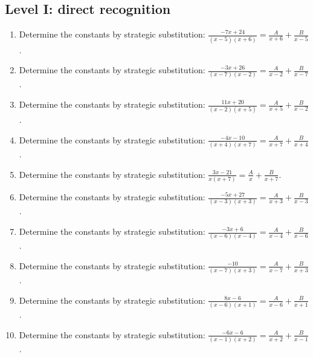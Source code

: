 \documentclass[11pt,oneside]{book}
\begin{document}
\subsection*{Level I: direct recognition}
\begin{enumerate}[leftmargin=*,label=\textbf{\arabic*.},itemsep=0.65\baselineskip]
\item Determine the constants by strategic substitution: $\displaystyle \frac{- 7 x + 24}{\left(x - 5\right) \left(x + 6\right)}=\frac{A}{x + 6} + \frac{B}{x - 5}$.
\item Determine the constants by strategic substitution: $\displaystyle \frac{- 3 x + 26}{\left(x - 7\right) \left(x - 2\right)}=\frac{A}{x - 2} + \frac{B}{x - 7}$.
\item Determine the constants by strategic substitution: $\displaystyle \frac{11 x + 20}{\left(x - 2\right) \left(x + 5\right)}=\frac{A}{x + 5} + \frac{B}{x - 2}$.
\item Determine the constants by strategic substitution: $\displaystyle \frac{- 4 x - 10}{\left(x + 4\right) \left(x + 7\right)}=\frac{A}{x + 7} + \frac{B}{x + 4}$.
\item Determine the constants by strategic substitution: $\displaystyle \frac{3 x - 21}{x \left(x + 7\right)}=\frac{A}{x} + \frac{B}{x + 7}$.
\item Determine the constants by strategic substitution: $\displaystyle \frac{- 5 x + 27}{\left(x - 3\right) \left(x + 3\right)}=\frac{A}{x + 3} + \frac{B}{x - 3}$.
\item Determine the constants by strategic substitution: $\displaystyle \frac{- 3 x + 6}{\left(x - 6\right) \left(x - 4\right)}=\frac{A}{x - 4} + \frac{B}{x - 6}$.
\item Determine the constants by strategic substitution: $\displaystyle \frac{-10}{\left(x - 7\right) \left(x + 3\right)}=\frac{A}{x - 7} + \frac{B}{x + 3}$.
\item Determine the constants by strategic substitution: $\displaystyle \frac{8 x - 6}{\left(x - 6\right) \left(x + 1\right)}=\frac{A}{x - 6} + \frac{B}{x + 1}$.
\item Determine the constants by strategic substitution: $\displaystyle \frac{- 6 x - 6}{\left(x - 1\right) \left(x + 2\right)}=\frac{A}{x + 2} + \frac{B}{x - 1}$.
\end{enumerate}
\end{document}

